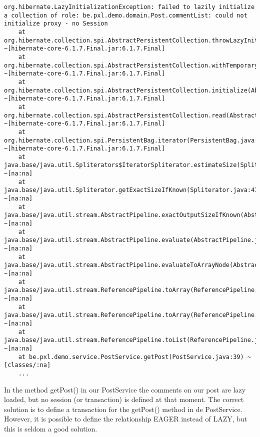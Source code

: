 \begin{lstlisting}[basicstyle=\tiny]
org.hibernate.LazyInitializationException: failed to lazily initialize a collection of role: be.pxl.demo.domain.Post.commentList: could not initialize proxy - no Session
	at org.hibernate.collection.spi.AbstractPersistentCollection.throwLazyInitializationException(AbstractPersistentCollection.java:635) ~[hibernate-core-6.1.7.Final.jar:6.1.7.Final]
	at org.hibernate.collection.spi.AbstractPersistentCollection.withTemporarySessionIfNeeded(AbstractPersistentCollection.java:218) ~[hibernate-core-6.1.7.Final.jar:6.1.7.Final]
	at org.hibernate.collection.spi.AbstractPersistentCollection.initialize(AbstractPersistentCollection.java:615) ~[hibernate-core-6.1.7.Final.jar:6.1.7.Final]
	at org.hibernate.collection.spi.AbstractPersistentCollection.read(AbstractPersistentCollection.java:136) ~[hibernate-core-6.1.7.Final.jar:6.1.7.Final]
	at org.hibernate.collection.spi.PersistentBag.iterator(PersistentBag.java:366) ~[hibernate-core-6.1.7.Final.jar:6.1.7.Final]
	at java.base/java.util.Spliterators$IteratorSpliterator.estimateSize(Spliterators.java:1865) ~[na:na]
	at java.base/java.util.Spliterator.getExactSizeIfKnown(Spliterator.java:414) ~[na:na]
	at java.base/java.util.stream.AbstractPipeline.exactOutputSizeIfKnown(AbstractPipeline.java:470) ~[na:na]
	at java.base/java.util.stream.AbstractPipeline.evaluate(AbstractPipeline.java:574) ~[na:na]
	at java.base/java.util.stream.AbstractPipeline.evaluateToArrayNode(AbstractPipeline.java:260) ~[na:na]
	at java.base/java.util.stream.ReferencePipeline.toArray(ReferencePipeline.java:616) ~[na:na]
	at java.base/java.util.stream.ReferencePipeline.toArray(ReferencePipeline.java:622) ~[na:na]
	at java.base/java.util.stream.ReferencePipeline.toList(ReferencePipeline.java:627) ~[na:na]
	at be.pxl.demo.service.PostService.getPost(PostService.java:39) ~[classes/:na]
	...
\end{lstlisting}

In the method getPost() in our PostService the comments on our post are lazy loaded, but no session (or transaction) is defined at that moment. 
The correct solution is to define a transaction for the getPost() method in de PostService. However, it is possible to define the relationship EAGER instead of LAZY, but this is seldom a good solution.



